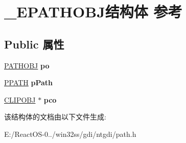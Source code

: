 \hypertarget{struct___e_p_a_t_h_o_b_j}{}\section{\+\_\+\+E\+P\+A\+T\+H\+O\+B\+J结构体 参考}
\label{struct___e_p_a_t_h_o_b_j}
\subsection*{Public 属性}
\begin{DoxyCompactItemize}
\item 
\mbox{\label{struct___e_p_a_t_h_o_b_j_a1e7f23e6344bed5a08a2ac2fcbcef4ae}} 
\hyperlink{struct___p_a_t_h_o_b_j}{P\+A\+T\+H\+O\+BJ} {\bfseries po}
\item 
\mbox{\label{struct___e_p_a_t_h_o_b_j_a9dbfd7284d6748ecf135eff43acb6ea2}} 
\hyperlink{struct___p_a_t_h}{P\+P\+A\+TH} {\bfseries p\+Path}
\item 
\mbox{\label{struct___e_p_a_t_h_o_b_j_a5dc81d78f23530a2db5b7e40721e95bb}} 
\hyperlink{struct___c_l_i_p_o_b_j}{C\+L\+I\+P\+O\+BJ} $\ast$ {\bfseries pco}
\end{DoxyCompactItemize}


该结构体的文档由以下文件生成\+:\begin{DoxyCompactItemize}
\item 
E\+:/\+React\+O\+S-\/0../win32ss/gdi/ntgdi/path.\+h\end{DoxyCompactItemize}
